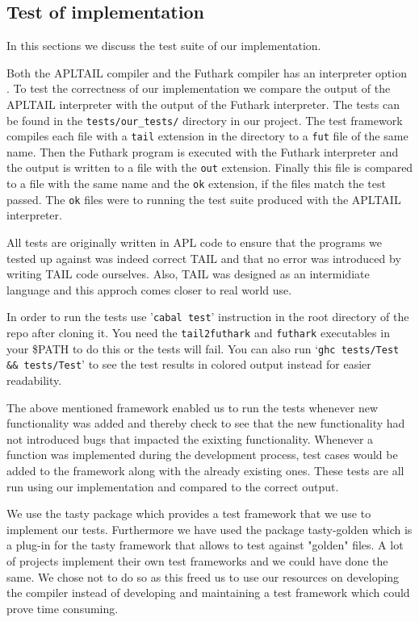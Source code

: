 \documentclass[11pt]{article}
\begin{document}
\subsection{Test of implementation}

In this sections we discuss the test suite of our implementation.

Both the APLTAIL compiler and the Futhark compiler has an interpreter option \cite{ElsmanDybdal:Array:2014} \cite{TroelsHenriksen}.
To test the correctness of our implementation we compare the output of the APLTAIL interpreter with the output of the Futhark interpreter.
The tests can be found in the {\tt tests/our\_tests/} directory in our project.
The test framework compiles each file with a {\tt tail} extension in the directory to a {\tt fut} file of the same name.
Then the Futhark program is executed with the Futhark interpreter and the output is written to a file with the {\tt out} extension.
Finally this file is compared to a file with the same name and the {\tt ok} extension, if the files match the test passed.
The {\tt ok} files were to running the test suite produced with the APLTAIL interpreter.

All tests are originally written in APL code to ensure that the programs we tested up against was indeed correct TAIL and that no error was introduced by writing TAIL code ourselves.
Also, TAIL was designed as an intermidiate language and this approch comes closer to real world use.

In order to run the tests use '{\tt cabal test}' instruction in the root directory of the repo after cloning it. 
You need the {\tt tail2futhark} and {\tt futhark} executables in your \$PATH to do this or the tests will fail. 
You can also run `{\tt ghc tests/Test \&\& tests/Test}' to see the test results in colored output instead for easier readability.

The above mentioned framework enabled us to run the tests whenever new functionality was added and thereby check to see that the new functionality had not introduced bugs that impacted the exixting functionality. 
Whenever a function was implemented during the development process, test cases would be added to the framework along with the already existing ones. These tests are all run using our implementation and compared to the correct output.

We use the tasty package \cite{tasty} which provides a test framework that we use to implement our tests. Furthermore we have used the
package tasty-golden \cite{tasty-golden} which is a plug-in for the tasty framework that allows to test against "golden" files.
A lot of projects implement their own test frameworks and we could have done the same.
We chose not to do so as this freed us to use our resources on developing the compiler instead of developing and maintaining a
test framework which could prove time consuming.
\end{document}
